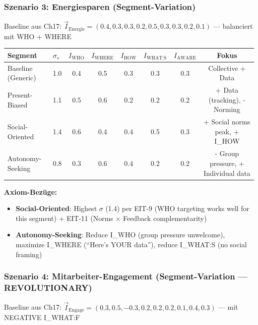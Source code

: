 \subsubsection{Szenario 3: Energiesparen (Segment-Variation)}

Baseline aus Ch17: $\vec{I}_{\text{Energie}} = (0.4, 0.3, 0.3, 0.2, 0.5, 0.3, 0.3, 0.2, 0.1)$ — balanciert mit WHO + WHERE

\begin{center}
\small
\renewcommand{\arraystretch}{1.3}
\begin{tabular}{@{}llcccccc@{}}
\toprule
\textbf{Segment} & \textbf{$\sigma_s$} & $I_{\text{WHO}}$ & $I_{\text{WHERE}}$ & $I_{\text{HOW}}$ & $I_{\text{WHAT:S}}$ & $I_{\text{AWARE}}$ & \textbf{Fokus} \\
\midrule
Baseline (Generic) & 1.0 & 0.4 & 0.5 & 0.3 & 0.3 & 0.3 & Collective + Data \\
Present-Biased & 1.1 & 0.5 & 0.6 & 0.2 & 0.2 & 0.2 & + Data (tracking), - Norming \\
Social-Oriented & 1.4 & 0.6 & 0.4 & 0.4 & 0.5 & 0.3 & + Social norms peak, + I_HOW \\
Autonomy-Seeking & 0.8 & 0.3 & 0.6 & 0.4 & 0.2 & 0.2 & - Group pressure, + Individual data \\
\bottomrule
\end{tabular}
\end{center}

\textbf{Axiom-Bezüge:}
\begin{itemize}[nosep]
\item \textbf{Social-Oriented}: Highest $\sigma$ (1.4) per EIT-9 (WHO targeting works well for this segment) + EIT-11 (Norms × Feedback complementarity)
\item \textbf{Autonomy-Seeking}: Reduce I_WHO (group pressure unwelcome), maximize I_WHERE (``Here's YOUR data''), reduce I_WHAT:S (no social framing)
\end{itemize}

\subsubsection{Szenario 4: Mitarbeiter-Engagement (Segment-Variation — REVOLUTIONARY)}

Baseline aus Ch17: $\vec{I}_{\text{Engage}} = (0.3, 0.5, -0.3, 0.2, 0.2, 0.2, 0.1, 0.4, 0.3)$ — mit NEGATIVE I_WHAT:F

